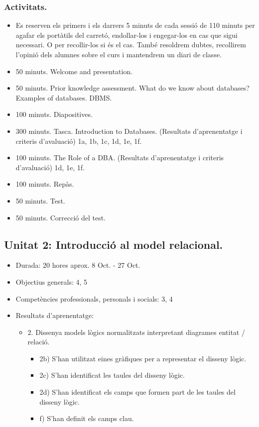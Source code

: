 \documentclass[catalan, a4paper, 12pt, titlepage]{article}
\begin{document}
  \subsubsection{Activitats.}

  \begin{itemize}
          \item Es reserven els primers i els darrers 5 minuts de cada sessió de 110 minuts per agafar els portàtils del carretó, endollar-los i engegar-los en cas que sigui necessari. O per recollir-los si és el cas. També resoldrem dubtes, recollirem l'opinió dels alumnes sobre el curs i mantendrem un diari de classe.
	  \item 50 minuts. Welcome and presentation.
	  \item 50 minuts. Prior knowledge assessment. What do we know about databases? Examples of databases. DBMS.
	  \item 100 minuts. Diapositives.
	  \item 300 minuts. Tasca. Introduction to Databases.
		  (\faGraduationCap Resultats d'aprenentatge i criteris d'avaluació) 1a, 1b, 1c, 1d, 1e, 1f.
	  \item 100 minuts. The Role of a DBA.
		  (\faGraduationCap Resultats d'aprenentatge i criteris d'avaluació) 1d, 1e, 1f.
	  \item 100 minuts. Repàs.
	  \item 50 minuts. Test.
	  \item 50 minuts. Correcció del test.
  \end{itemize}

  \subsection{Unitat 2: Introducció al model relacional.}

  \begin{itemize}
	\item Durada: 20 hores aprox. 8 Oct. - 27 Oct.
	\item Objectius generals: 4, 5
	\item Competències professionals, personals i socials: 3, 4
	\item Resultats d'aprenentatge: 
		\begin{itemize}
			\item 2. Dissenya models lògics normalitzats interpretant diagrames entitat / relació.
				\begin{itemize}
					\item 2b) S'han utilitzat eines gràfiques per a representar el disseny lògic.
					\item 2c) S'han identificat les taules del disseny lògic.
					\item 2d) S'han identificat els camps que formen part de les taules del disseny lògic.
					\item f) S'han definit els camps clau.
				\end{itemize}
		\end{itemize}
  \end{itemize}
\end{document}
